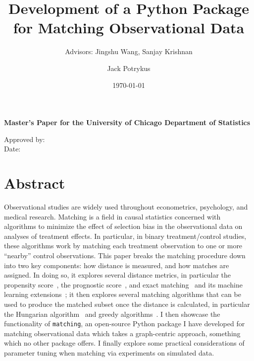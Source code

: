 \documentclass[11pt]{extarticle}
\title{Development of a Python Package for Matching Observational Data}
\subtitle{{\Large Advisors: Jingshu Wang, Sanjay Krishnan}}
\author{Jack Potrykus}
\date{\today}
\begin{document}
\begin{center}{\large \bfseries Master’s Paper for the University of Chicago Department of Statistics}\end{center}
\vspace{5cm}

{\let\newpage\relax\maketitle}



\vfill{\null}
{\Large 
  Approved by:~\hrulefill\vspace{0.5cm}\\%
  Date:~\hrulefill%
}
\newpage{}

\section*{Abstract}
\label{sec:abstract}

Observational studies are widely used throughout econometrics, psychology, and medical research.
Matching is a field in causal statistics concerned with algorithms to minimize the effect of selection bias in the observational data on analyses of treatment effects.
In particular, in binary treatment/control studies, these algorithms work by matching each treatment observation to one or more ``nearby'' control observations.
This paper breaks the matching procedure down into two key components: how distance is measured, and how matches are assigned.
In doing so, it explores several distance metrics, in particular the propensity score~\parencite{rosenbaum_central_1983}, the prognostic score~\parencite{hansen_prognostic_2008}, and exact matching~\parencite{iacus_causal_2012} and its machine learning extensions~\parencite{liu_interpretable_2019, wang_flame_2021}; it then explores several matching algorithms that can be used to produce the matched subset once the distance is calculated, in particular the Hungarian algorithm~\parencite{munkres_algorithms_1957} and greedy algorithms~\parencite{ho_matchit_2011}.
I then showcase the functionality of \texttt{matching}, an open-source Python package I have developed for matching observational data which takes a graph-centric approach, something which no other package offers.
I finally explore some practical considerations of parameter tuning when matching via experiments on simulated data.
\end{document}
